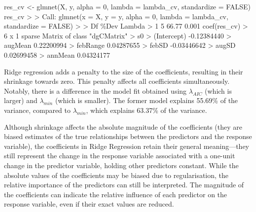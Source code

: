 \documentclass[
  letterpaper,
]{book}
\newenvironment{Shaded}{\begin{snugshade}}{\end{snugshade}}
\newcommand{\AttributeTok}[1]{\textcolor[rgb]{0.40,0.45,0.13}{#1}}
\newcommand{\ConstantTok}[1]{\textcolor[rgb]{0.56,0.35,0.01}{#1}}
\newcommand{\DecValTok}[1]{\textcolor[rgb]{0.68,0.00,0.00}{#1}}
\newcommand{\ErrorTok}[1]{\textcolor[rgb]{0.68,0.00,0.00}{#1}}
\newcommand{\FloatTok}[1]{\textcolor[rgb]{0.68,0.00,0.00}{#1}}
\newcommand{\FunctionTok}[1]{\textcolor[rgb]{0.28,0.35,0.67}{#1}}
\newcommand{\NormalTok}[1]{\textcolor[rgb]{0.00,0.23,0.31}{#1}}
\newcommand{\OtherTok}[1]{\textcolor[rgb]{0.00,0.23,0.31}{#1}}
\newcommand{\SpecialCharTok}[1]{\textcolor[rgb]{0.37,0.37,0.37}{#1}}
\newcommand{\StringTok}[1]{\textcolor[rgb]{0.13,0.47,0.30}{#1}}
\begin{document}
\begin{Shaded}
\begin{Highlighting}[]
\NormalTok{res\_cv }\OtherTok{\textless{}{-}} \FunctionTok{glmnet}\NormalTok{(X, y, }\AttributeTok{alpha =} \DecValTok{0}\NormalTok{, }\AttributeTok{lambda =}\NormalTok{ lambda\_cv,}
                 \AttributeTok{standardize =} \ConstantTok{FALSE}\NormalTok{)}
\NormalTok{res\_cv}
\SpecialCharTok{\textgreater{}} 
\ErrorTok{\textgreater{}}\NormalTok{ Call}\SpecialCharTok{:}  \FunctionTok{glmnet}\NormalTok{(}\AttributeTok{x =}\NormalTok{ X, }\AttributeTok{y =}\NormalTok{ y, }\AttributeTok{alpha =} \DecValTok{0}\NormalTok{, }\AttributeTok{lambda =}\NormalTok{ lambda\_cv, }\AttributeTok{standardize =} \ConstantTok{FALSE}\NormalTok{) }
\SpecialCharTok{\textgreater{}} 
\ErrorTok{\textgreater{}}\NormalTok{   Df  \%Dev Lambda}
\SpecialCharTok{\textgreater{}} \DecValTok{1}  \DecValTok{5} \FloatTok{66.77}  \FloatTok{0.001}
\FunctionTok{coef}\NormalTok{(res\_cv)}
\SpecialCharTok{\textgreater{}} \DecValTok{6}\NormalTok{ x }\DecValTok{1}\NormalTok{ sparse Matrix of class }\StringTok{"dgCMatrix"}
\SpecialCharTok{\textgreater{}}\NormalTok{                      s0}
\SpecialCharTok{\textgreater{}}\NormalTok{ (Intercept) }\SpecialCharTok{{-}}\FloatTok{0.12384440}
\SpecialCharTok{\textgreater{}}\NormalTok{ augMean      }\FloatTok{0.22200994}
\SpecialCharTok{\textgreater{}}\NormalTok{ febRange     }\FloatTok{0.04287655}
\SpecialCharTok{\textgreater{}}\NormalTok{ febSD       }\SpecialCharTok{{-}}\FloatTok{0.03446642}
\SpecialCharTok{\textgreater{}}\NormalTok{ augSD        }\FloatTok{0.02699458}
\SpecialCharTok{\textgreater{}}\NormalTok{ annMean      }\FloatTok{0.04324177}
\end{Highlighting}
\end{Shaded}

Ridge regression adds a penalty to the size of the coefficients,
resulting in their shrinkage towards zero. This penalty affects all
coefficients simultaneously. Notably, there is a difference in the model
fit obtained using \(\lambda_{AIC}\) (which is larger) and
\(\lambda_{min}\) (which is smaller). The former model explains 55.69\%
of the variance, compared to \(\lambda_{min}\), which explains 63.37\%
of the variance.

Although shrinkage affects the absolute magnitude of the coefficients
(they are biased estimates of the true relationships between the
predictors and the response variable), the coefficients in Ridge
Regression retain their general meaning---they still represent the
change in the response variable associated with a one-unit change in the
predictor variable, holding other predictors constant. While the
absolute values of the coefficients may be biased due to regularisation,
the relative importance of the predictors can still be interpreted. The
magnitude of the coefficients can indicate the relative influence of
each predictor on the response variable, even if their exact values are
reduced.
\end{document}
